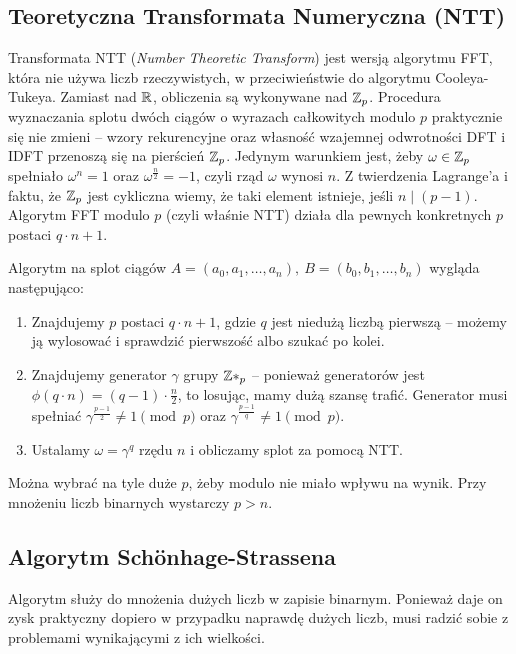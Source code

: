 \subsection{Teoretyczna Transformata Numeryczna (NTT)}
Transformata NTT (\textit{Number Theoretic Transform}) jest wersją algorytmu FFT, która nie używa liczb rzeczywistych, w przeciwieństwie do algorytmu Cooleya-Tukeya. Zamiast nad \( \mathbb{R} \), obliczenia są wykonywane nad \( \mathbb{Z}_p \). Procedura wyznaczania splotu dwóch ciągów o wyrazach całkowitych modulo \( p \) praktycznie się nie zmieni -- wzory rekurencyjne oraz własność wzajemnej odwrotności DFT i IDFT przenoszą się na pierścień \( \mathbb{Z}_p \). Jedynym warunkiem jest, żeby \( \omega \in \mathbb{Z}_p \) spełniało \( \omega^n = 1 \) oraz  \( \omega^{\frac{n}{2}} = -1 \), czyli rząd \( \omega \) wynosi \( n \). Z twierdzenia Lagrange'a i faktu, że \( \mathbb{Z}_p \) jest cykliczna wiemy, że taki element istnieje, jeśli \( n \mid (p - 1) \). Algorytm FFT modulo \( p \) (czyli właśnie NTT) działa dla pewnych konkretnych \( p \) postaci \( q \cdot n + 1 \).

Algorytm na splot ciągów \( A = (a_0, a_1, \ldots, a_n), \ B = (b_0, b_1, \ldots, b_n) \) wygląda następująco:
\begin{greyframe}
    \begin{enumerate}
        \item Znajdujemy \( p \) postaci \( q \cdot n + 1 \), gdzie \( q \) jest niedużą liczbą pierwszą -- możemy ją wylosować i sprawdzić pierwszość albo szukać po kolei.
        \item Znajdujemy generator \( \gamma \) grupy \( \mathbb{Z}*_p \) -- ponieważ generatorów jest \( \phi(q \cdot n) = (q - 1) \cdot \frac{n}{2} \), to losując, mamy dużą szansę trafić. Generator musi spełniać \( \gamma^{\frac{p-1}{2}} \neq 1 \pmod{p} \) oraz \( \gamma^{\frac{p-1}{q}} \neq 1 \pmod{p} \).
        \item Ustalamy \( \omega = \gamma^q \) rzędu \( n \) i obliczamy splot za pomocą NTT.
    \end{enumerate}
\end{greyframe}
Można wybrać na tyle duże \( p \), żeby modulo nie miało wpływu na wynik. Przy mnożeniu liczb binarnych wystarczy \( p > n \).


\subsection{Algorytm Sch{\"o}nhage-Strassena}
Algorytm służy do mnożenia dużych liczb w zapisie binarnym. Ponieważ daje on zysk praktyczny dopiero w przypadku naprawdę dużych liczb, musi radzić sobie z problemami wynikającymi z ich wielkości.

